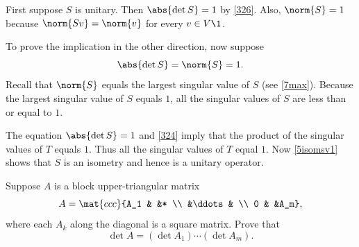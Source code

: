 \begin{Solution}
First suppose $S$ is unitary. Then $\abs{\det S} = 1$ by \ref{326}. Also, $\norm{S} = 1$ because $\norm{Sv} = \norm{v}$ for every
$v \in V\1$.

To prove the implication in the other direction, now suppose
\[
\abs{\det S} = \norm{S} = 1.
\]
Recall that $\norm{S}$ equals the largest singular value of $S$ (see \ref{7max}). Because the largest singular value of $S$ equals $1$, all the singular values of $S$ are less than or equal to $1$.

The equation $\abs{\det S} = 1$ and \ref{324} imply that the product of the singular values of $T$ equals $1$. Thus all the singular values of $T$ equal $1$. Now \ref{5isomsv1} shows that $S$ is an isometry and hence is a unitary operator.
\end{Solution}

\exercise
Suppose $A$ is a block upper-triangular matrix \label{blockdet}
\[
A = \mat{ccc}{A_1 & &* \\ &\ddots & \\ 0 & &A_m},
\]
where each $A_k$ along the diagonal is a square matrix.  Prove that
\[
\det A = (\det A_1) \dotsm (\det A_m).
\]
\exercisedisplayend

